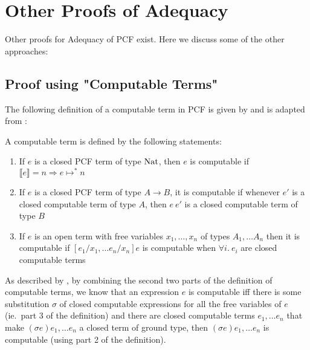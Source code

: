 \section{Other Proofs of Adequacy}\label{ch8}
Other proofs for Adequacy of PCF exist. Here we discuss some of the other approaches:

\subsection{Proof using "Computable Terms"}
The following definition of a computable term in PCF is given by \citep{Gunter92} and is adapted from \citep{Plotkin77}:

\vspace{0.5cm}

\begin{defn} A computable term is defined by the following statements:
\begin{enumerate}
\item{If $e$ is a closed PCF term of type $\operatorname{Nat}$, then $e$ is computable if $\llbracket e \rrbracket = n \Rightarrow e \mapsto^* n$}
\item{If $e$ is a closed PCF term of type $A \to B$, it is computable if whenever $e'$ is a closed computable term of type $A$, then $e \ e'$ is a closed computable term of type $B$}
\item{If $e$ is an open term with free variables $x_1, \dots, x_n$ of types $A_1, \dots A_n$ then it is computable if $[e_1/x_1, \dots e_n/x_n]e$ is computable when $\forall i. \ e_i$ are closed computable terms}
\end{enumerate}
\end{defn}  

As described by \citep{Gunter92}, by combining the second two parts of the definition of computable terms, we know that an expression $e$ is computable iff there is some substitution $\sigma$ of closed computable expressions for all the free variables of $e$ (ie.\ part 3 of the definition) and there are closed computable terms $e_1, \dots e_n$ that make $(\sigma e)e_1, \dots e_n$ a closed term of ground type, then  $(\sigma e)e_1, \dots e_n$ is computable (using part 2 of the definition).  


